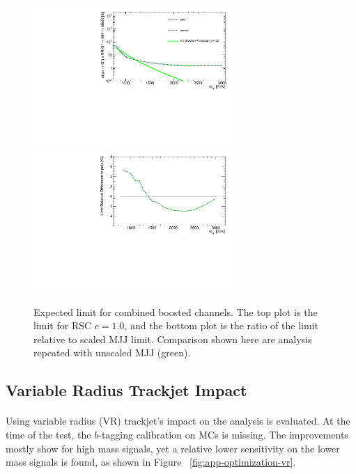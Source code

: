 \begin{figure}[htbp!]
\begin{center}
\includegraphics[angle=270, width=0.68\textwidth]{./figures/boosted/AppendixOptimization/CompareLimits_HH_BoostedNewRun2-pole_c10.pdf}\\
\includegraphics[angle=270, width=0.68\textwidth]{./figures/boosted/AppendixOptimization/CompareLimits_HH_BoostedNewRun2-pole_c10_ratio.pdf}
  \caption{Expected limit for combined boosted channels. The top plot is the limit for RSC $c=1.0$, and the bottom plot is the ratio of the limit relative to scaled MJJ limit. Comparison shown here are analysis repeated with unscaled MJJ (green).}
  \label{fig:app-optimization-polemass}
\end{center}
\end{figure}

\clearpage
\subsection{Variable Radius Trackjet Impact}
\label{sec:app-optimization-vrjet}
\paragraph{}
Using variable radius (VR) trackjet's impact on the analysis is evaluated. At the time of the test, the $b$-tagging calibration on MCs is missing. The improvements mostly show for high mass signals, yet a relative lower sensitivity on the lower mass signals is found, as shown in Figure ~\ref{fig:app-optimization-vr}.

